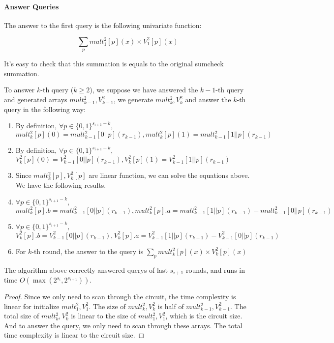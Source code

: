 {	\paragraph*{Answer Queries}
	The answer to the first query is the following univariate function:
	
	$$\sum_{p}mult_{1}^2[p](x)\times V_1^2[p](x)$$
	
	It's easy to check that this summation is equals to the original sumcheck summation.
	
	To answer $k$-th query ($k\ge 2$), we suppose we have answered the $k-1$-th query and generated arrays $mult_{k-1}^2, V_{k-1}^2$, we generate $mult_{k}^2, V_{k}^2$ and answer the $k$-th query in the following way:
	
	\begin{enumerate}
		\item By definition, $\forall p \in {\{0, 1\}^{s_{i+1}-k}}$, $mult_{k}^2[p](0)=mult_{k-1}^2[0||p](r_{k-1}), mult_{k}^2[p](1)=mult_{k-1}^2[1||p](r_{k-1})$
		\item By definition, $\forall p \in {\{0, 1\}^{s_{i+1}-k}}$, $V_{k}^2[p](0)=V_{k-1}^2[0||p](r_{k-1}), V_{k}^2[p](1)=V_{k-1}^2[1||p](r_{k-1})$
		\item Since $mult_{k}^2[p], V_{k}^2[p]$ are linear function, we can solve the equations above. We have the following results.
		\item $\forall p \in {\{0, 1\}^{s_{i+1}-k}}$, $mult_{k}^2[p].b = mult_{k-1}^2[0||p](r_{k-1}), mult_{k}^2[p].a = mult_{k-1}^2[1||p](r_{k-1})-mult_{k-1}^2[0||p](r_{k-1})$
		\item $\forall p \in {\{0, 1\}^{s_{i+1}-k}}$, $V_{k}^2[p].b = V_{k-1}^2[0||p](r_{k-1}), V_{k}^2[p].a = V_{k-1}^2[1||p](r_{k-1})-V_{k-1}^2[0||p](r_{k-1})$
		\item For $k$-th round, the answer to the query is $\sum_{p} mult_{k}^2[p](x)\times V_{k}^2[p](x)$
	\end{enumerate}
	
	\begin{theorem} The algorithm above correctly answered querys of last $s_{i+1}$ rounds, and runs in time $O(\max(2^{s_{i}}, 2^{s_{i+1}}))$.
	\end{theorem}
	
	\begin{proof}
		Since we only need to scan through the circuit, the time complexity is linear for initialize $mult_{1}^2, V_1^2$. The size of $mult_{k}^2, V_k^2$ is half of $mult_{k-1}^2, V_{k-1}^2$. The total size of $mult_{k}^2, V_k^2$ is linear to the size of $mult_1^2, V_1^2$, which is the circuit size. And to answer the query, we only need to scan through these arrays. The total time complexity is linear to the circuit size.
		

\end{proof}}

